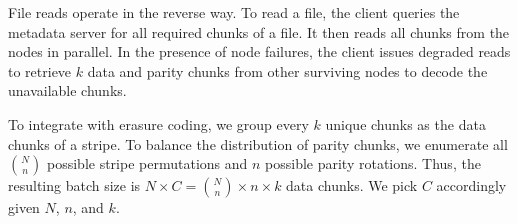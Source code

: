 File reads operate in the reverse way.  To read a file, the client queries the
metadata server for all required chunks of a file.  It then reads all chunks
from the nodes in parallel. In the presence of node failures, the client
issues degraded reads to retrieve $k$ data and parity chunks from other
surviving nodes to decode the unavailable chunks. 

To integrate with erasure coding, we group every $k$ unique chunks as the data
chunks of a stripe.  To balance the distribution of parity chunks, we
enumerate all ${N\choose n}$ possible stripe permutations and $n$ possible
parity rotations.  Thus, the resulting batch size is 
$N\times C = {N\choose n}\times n \times k$ data chunks.  We pick $C$
accordingly given $N$, $n$, and $k$. 






